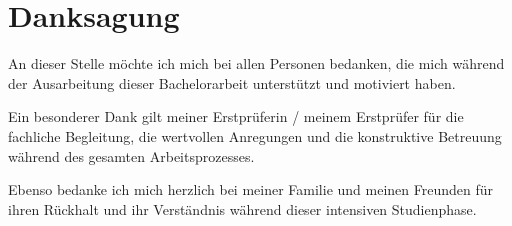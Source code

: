 
\section*{Danksagung}

An dieser Stelle möchte ich mich bei allen Personen bedanken, die mich während der Ausarbeitung dieser Bachelorarbeit unterstützt und motiviert haben.

Ein besonderer Dank gilt meiner Erstprüferin / meinem Erstprüfer für die fachliche Begleitung, die wertvollen Anregungen und die konstruktive Betreuung während des gesamten Arbeitsprozesses.

Ebenso bedanke ich mich herzlich bei meiner Familie und meinen Freunden für ihren Rückhalt und ihr Verständnis während dieser intensiven Studienphase.

